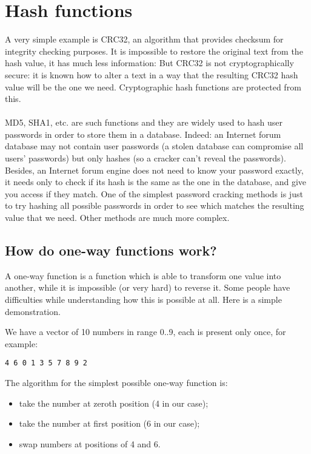 ﻿\newcommand{\HashFuncChapterName}{Hash functions}
\section{\HashFuncChapterName}
\label{hash_func}

\myindex{\HashFuncChapterName}
A very simple example is CRC32, an algorithm that provides  checksum for integrity checking purposes.
It is impossible to restore the original text from the hash value, it has much less information:
But CRC32 is not cryptographically secure: it is known how to alter a text in a way that the resulting
CRC32 hash value will be the one we need.
Cryptographic hash functions are protected from this. \\
\\
MD5, SHA1, etc. are such functions and they are widely used to hash user passwords in order to store them in a database.
Indeed: an Internet forum database may not contain user passwords 
(a stolen database can compromise all users' passwords) but only hashes 
(so a cracker can't reveal the passwords).
Besides, an Internet forum engine does not need to know your password exactly, it needs only to check if its hash
is the same as the one in the database, and give you access if they match.
One of the simplest password cracking methods is just to try hashing all possible passwords in order
to see which matches the resulting value that we need.
Other methods are much more complex.

\subsection{How do one-way functions work?}

A one-way function is a function which is able to transform one value into another,
while it is impossible (or very hard) to reverse it.
Some people have difficulties while understanding how this is possible at all.
Here is a simple demonstration.

We have a vector of 10 numbers in range 0..9, each is present only once, for example:

\begin{lstlisting}
4 6 0 1 3 5 7 8 9 2
\end{lstlisting}

The algorithm for the simplest possible one-way function is:

\begin{itemize}
\item take the number at zeroth position (4 in our case);
\item take the number at first position (6 in our case);
\item swap numbers at positions of 4 and 6.
\end{itemize}

